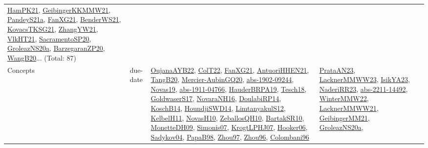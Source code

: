 {\begin{longtable}{lp{3cm}>{\raggedright}p{6cm}>{\raggedright}p{6cm}p{8cm}}
\href{articles/HamPK21.pdf}{HamPK21}\cite{HamPK21}, \href{papers/GeibingerKKMMW21.pdf}{GeibingerKKMMW21}\cite{GeibingerKKMMW21}, \href{articles/PandeyS21a.pdf}{PandeyS21a}\cite{PandeyS21a}, \href{articles/FanXG21.pdf}{FanXG21}\cite{FanXG21}, \href{papers/BenderWS21.pdf}{BenderWS21}\cite{BenderWS21}, \href{papers/KovacsTKSG21.pdf}{KovacsTKSG21}\cite{KovacsTKSG21}, \href{articles/ZhangYW21.pdf}{ZhangYW21}\cite{ZhangYW21}, \href{articles/VlkHT21.pdf}{VlkHT21}\cite{VlkHT21}, \href{articles/SacramentoSP20.pdf}{SacramentoSP20}\cite{SacramentoSP20}, \href{papers/GroleazNS20a.pdf}{GroleazNS20a}\cite{GroleazNS20a}, \href{papers/BarzegaranZP20.pdf}{BarzegaranZP20}\cite{BarzegaranZP20}, \href{papers/WangB20.pdf}{WangB20}\cite{WangB20}... (Total: 87)\\
Concepts & due-date & \href{papers/OujanaAYB22.pdf}{OujanaAYB22}\cite{OujanaAYB22}, \href{articles/ColT22.pdf}{ColT22}\cite{ColT22}, \href{articles/FanXG21.pdf}{FanXG21}\cite{FanXG21}, \href{papers/AntuoriHHEN21.pdf}{AntuoriHHEN21}\cite{AntuoriHHEN21}, \href{papers/TangB20.pdf}{TangB20}\cite{TangB20}, \href{papers/Mercier-AubinGQ20.pdf}{Mercier-AubinGQ20}\cite{Mercier-AubinGQ20}, \href{articles/abs-1902-09244.pdf}{abs-1902-09244}\cite{abs-1902-09244}, \href{articles/Novas19.pdf}{Novas19}\cite{Novas19}, \href{articles/abs-1911-04766.pdf}{abs-1911-04766}\cite{abs-1911-04766}, \href{articles/HauderBRPA19.pdf}{HauderBRPA19}\cite{HauderBRPA19}, \href{papers/Tesch18.pdf}{Tesch18}\cite{Tesch18}, \href{papers/GoldwaserS17.pdf}{GoldwaserS17}\cite{GoldwaserS17}, \href{articles/NovaraNH16.pdf}{NovaraNH16}\cite{NovaraNH16}, \href{papers/DoulabiRP14.pdf}{DoulabiRP14}\cite{DoulabiRP14}, \href{papers/KoschB14.pdf}{KoschB14}\cite{KoschB14}, \href{papers/HoundjiSWD14.pdf}{HoundjiSWD14}\cite{HoundjiSWD14}, \href{articles/LimtanyakulS12.pdf}{LimtanyakulS12}\cite{LimtanyakulS12}, \href{articles/KelbelH11.pdf}{KelbelH11}\cite{KelbelH11}, \href{articles/NovasH10.pdf}{NovasH10}\cite{NovasH10}, \href{articles/ZeballosQH10.pdf}{ZeballosQH10}\cite{ZeballosQH10}, \href{articles/BartakSR10.pdf}{BartakSR10}\cite{BartakSR10}, \href{papers/MonetteDH09.pdf}{MonetteDH09}\cite{MonetteDH09}, \href{articles/Simonis07.pdf}{Simonis07}\cite{Simonis07}, \href{papers/KrogtLPHJ07.pdf}{KrogtLPHJ07}\cite{KrogtLPHJ07}, \href{articles/Hooker06.pdf}{Hooker06}\cite{Hooker06}, \href{papers/Sadykov04.pdf}{Sadykov04}\cite{Sadykov04}, \href{articles/PapaB98.pdf}{PapaB98}\cite{PapaB98}, \href{articles/Zhou97.pdf}{Zhou97}\cite{Zhou97}, \href{papers/Zhou96.pdf}{Zhou96}\cite{Zhou96}, \href{papers/Colombani96.pdf}{Colombani96}\cite{Colombani96} & \href{articles/PrataAN23.pdf}{PrataAN23}\cite{PrataAN23}, \href{articles/LacknerMMWW23.pdf}{LacknerMMWW23}\cite{LacknerMMWW23}, \href{articles/IsikYA23.pdf}{IsikYA23}\cite{IsikYA23}, \href{articles/NaderiRR23.pdf}{NaderiRR23}\cite{NaderiRR23}, \href{articles/abs-2211-14492.pdf}{abs-2211-14492}\cite{abs-2211-14492}, \href{papers/WinterMMW22.pdf}{WinterMMW22}\cite{WinterMMW22}, \href{papers/LacknerMMWW21.pdf}{LacknerMMWW21}\cite{LacknerMMWW21}, \href{papers/GeibingerMM21.pdf}{GeibingerMM21}\cite{GeibingerMM21}, \href{papers/GroleazNS20a.pdf}{GroleazNS20a}\cite{GroleazNS20a}, 
\end{longtable}}
